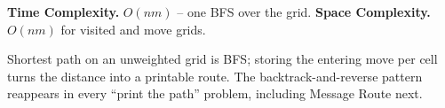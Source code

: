 \begin{complexitybox}
\textbf{Time Complexity.} $O(nm)$ -- one BFS over the grid.
\textbf{Space Complexity.} $O(nm)$ for visited and move grids.
\end{complexitybox}

\begin{takeawaybox}
Shortest path on an unweighted grid is BFS; storing the entering move per
cell turns the distance into a printable route. The backtrack-and-reverse
pattern reappears in every ``print the path'' problem, including Message
Route next.
\end{takeawaybox}
